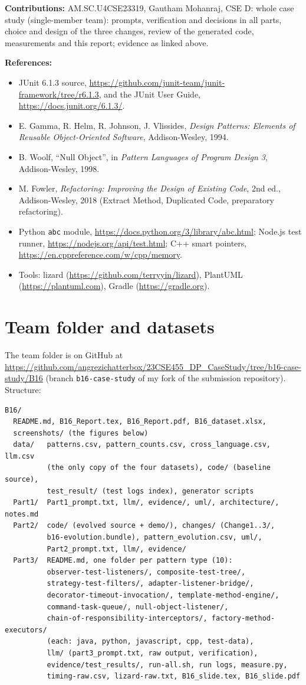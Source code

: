 \documentclass[11pt,a4paper]{article}
\newcommand{\entry}[1]{\textbf{#1:} }
\begin{document}
\entry{Contributions}AM.SC.U4CSE23319, Gautham Mohanraj, CSE D: whole case study (single-member team): prompts, verification and decisions in all parts, choice and design of the three changes, review of the generated code, measurements and this report; evidence as linked above.

\entry{References}
\begin{itemize}
\item JUnit 6.1.3 source, \url{https://github.com/junit-team/junit-framework/tree/r6.1.3}, and the JUnit User Guide, \url{https://docs.junit.org/6.1.3/}.
\item E. Gamma, R. Helm, R. Johnson, J. Vlissides, \emph{Design Patterns: Elements of Reusable Object-Oriented Software}, Addison-Wesley, 1994.
\item B. Woolf, ``Null Object'', in \emph{Pattern Languages of Program Design 3}, Addison-Wesley, 1998.
\item M. Fowler, \emph{Refactoring: Improving the Design of Existing Code}, 2nd ed., Addison-Wesley, 2018 (Extract Method, Duplicated Code, preparatory refactoring).
\item Python \texttt{abc} module, \url{https://docs.python.org/3/library/abc.html}; Node.js test runner, \url{https://nodejs.org/api/test.html}; C++ smart pointers, \url{https://en.cppreference.com/w/cpp/memory}.
\item Tools: lizard (\url{https://github.com/terryyin/lizard}), PlantUML (\url{https://plantuml.com}), Gradle (\url{https://gradle.org}).
\end{itemize}

\section{Team folder and datasets}
The team folder is on GitHub at \url{https://github.com/angrezichatterbox/23CSE455_DP_CaseStudy/tree/b16-case-study/B16} (branch \texttt{b16-case-study} of my fork of the submission repository). Structure:
\begin{verbatim}
B16/
  README.md, B16_Report.tex, B16_Report.pdf, B16_dataset.xlsx,
  screenshots/ (the figures below)
  data/   patterns.csv, pattern_counts.csv, cross_language.csv, llm.csv
          (the only copy of the four datasets), code/ (baseline source),
          test_result/ (test logs index), generator scripts
  Part1/  Part1_prompt.txt, llm/, evidence/, uml/, architecture/, notes.md
  Part2/  code/ (evolved source + demo/), changes/ (Change1..3/,
          b16-evolution.bundle), pattern_evolution.csv, uml/,
          Part2_prompt.txt, llm/, evidence/
  Part3/  README.md, one folder per pattern type (10):
          observer-test-listeners/, composite-test-tree/,
          strategy-test-filters/, adapter-listener-bridge/,
          decorator-timeout-invocation/, template-method-engine/,
          command-task-queue/, null-object-listener/,
          chain-of-responsibility-interceptors/, factory-method-executors/
          (each: java, python, javascript, cpp, test-data),
          llm/ (part3_prompt.txt, raw output, verification),
          evidence/test_results/, run-all.sh, run logs, measure.py,
          timing-raw.csv, lizard-raw.txt, B16_slide.tex, B16_slide.pdf
\end{verbatim}
\end{document}
